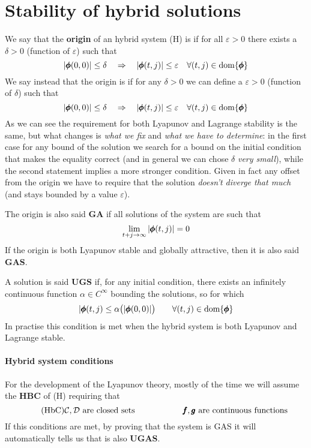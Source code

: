 \section{Stability of hybrid solutions}	
	We say that the \textbf{origin} of an hybrid system (H) is  if for all $\varepsilon > 0$ there exists a $\delta > 0$ (function of $\varepsilon$) such that
	\[ |\pmb{\phi}(0,0)| \leq \delta \quad \Rightarrow \quad |\pmb{\phi}(t,j)|\leq \varepsilon \quad \forall (t,j) \in \textrm{dom}\{\pmb{\phi}\} \]
	We say instead that the origin is  if for any $\delta > 0$ we can define a $\varepsilon > 0$ (function of $\delta$) such that
	\[ |\pmb{\phi}(0,0)| \leq \delta \quad \Rightarrow \quad |\pmb{\phi}(t,j)|\leq \varepsilon \quad \forall (t,j) \in \textrm{dom}\{\pmb{\phi}\} \]
	As we can see the requirement for both Lyapunov and Lagrange stability is the same, but what changes is \textit{what we fix} and \textit{what we have to determine}: in the first case for any bound of the solution we search for a bound on the initial condition that makes the equality correct (and in general we can chose $\delta$ \textit{very small}), while the second statement implies a more stronger condition. Given in fact any offset from the origin we have to require that the solution \textit{doesn't diverge that much} (and stays bounded by a value $\varepsilon$).
	
	The origin is also said  \textbf{GA} if all solutions of the system are such that
	\[ \lim_{t+j\rightarrow \infty} |\pmb{\phi}(t,j)| = 0 \]	
	If the origin is both Lyapunov stable and globally attractive, then it is also said  \textbf{GAS}.
	
	A solution is said  \textbf{UGS} if, for any initial condition, there exists an infinitely continuous function $\alpha \in C^\infty$ bounding the solutions, so for which
	\[ |\pmb{\phi}(t,j) \leq \alpha\big(|\pmb{\phi}(0,0)|\big) \qquad \forall (t,j)\in \textrm{dom}\{\pmb{\phi}\} \]
	In practise this condition is met when the hybrid system is both Lyapunov and Lagrange stable.
	
	\paragraph{Hybrid system conditions} For the development of the Lyapunov theory, mostly of the time we will assume the  \textbf{HBC} of (H) requiring that
	\[ \tag{HbC} \mathcal C,\mathcal D \textrm{ are closed sets} \hspace{2cm} \pmb{f}, \pmb{g} \textrm{ are continuous functions} \]
	If this conditions are met, by proving that the system is GAS it will automatically tells us that is also  \textbf{UGAS}.
	
